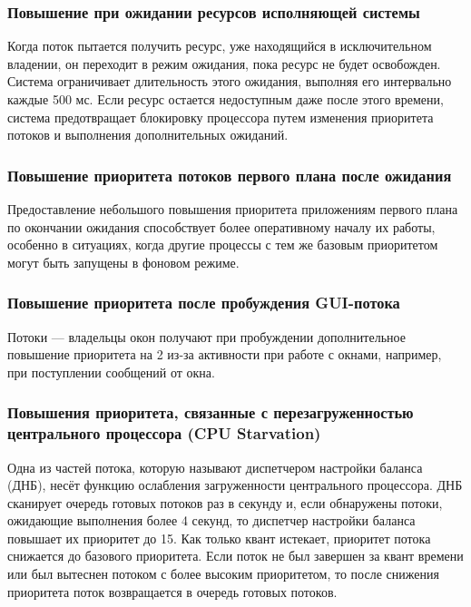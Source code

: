 \clearpage

\subsubsection*{Повышение при ожидании ресурсов исполняющей системы}

Когда поток пытается получить ресурс, уже находящийся в исключительном владении, он переходит в режим ожидания, пока ресурс не будет освобожден. 
Система ограничивает длительность этого ожидания, выполняя его интервально каждые 500 мс. 
Если ресурс остается недоступным даже после этого времени, система предотвращает блокировку процессора путем изменения приоритета потоков и выполнения дополнительных ожиданий.

\subsubsection*{Повышение приоритета потоков первого плана после ожидания}

Предоставление небольшого повышения приоритета приложениям первого плана по окончании ожидания способствует более оперативному началу их работы, особенно в ситуациях, когда другие процессы с тем же базовым приоритетом могут быть запущены в фоновом режиме.

\subsubsection*{Повышение приоритета после пробуждения GUI-потока}

Потоки --- владельцы окон получают при пробуждении дополнительное повышение приоритета на 2 из-за активности при работе с окнами, например, при поступлении сообщений от окна.

\subsubsection*{Повышения приоритета, связанные с перезагруженностью центрального процессора (CPU Starvation)}

Одна из частей потока, которую называют диспетчером настройки баланса (ДНБ), несёт функцию  ослабления загруженности центрального процессора. 
ДНБ сканирует очередь готовых потоков раз в секунду и, если обнаружены потоки, ожидающие выполнения более 4 секунд, то диспетчер настройки баланса повышает их приоритет до 15. 
Как только квант истекает, приоритет потока снижается до базового приоритета. 
Если поток не был завершен за квант времени или был вытеснен потоком с более высоким приоритетом, то после снижения приоритета поток возвращается в очередь готовых потоков.

